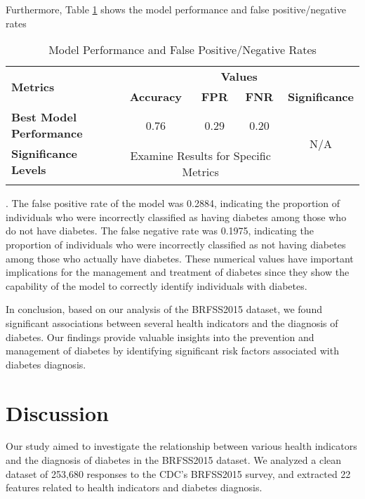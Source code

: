 \documentclass[12pt]{article}
\begin{document}
Furthermore, Table \ref{table:model_performance} shows the model performance and false positive/negative rates\begin{table}[htbp]
\centering
\caption{Model Performance and False Positive/Negative Rates}
\label{table:model_performance}
\begin{tabular}{@{}lcccc@{}}
\toprule
\multirow{2}{*}{\textbf{Metrics}} & \multicolumn{4}{c}{\textbf{Values}}                                        \\ \cmidrule(l){2-5}
                                  & \textbf{Accuracy} & \textbf{FPR} & \textbf{FNR} & \textbf{Significance} \\ \midrule
\textbf{Best Model Performance}   & 0.76             & 0.29        & 0.20        & \multirow{2}{*}{N/A}  \\ \cline{1-4}
\textbf{Significance Levels}      & \multicolumn{4}{c}{\multirow{2}{*}{Examine Results for Specific Metrics}} \\ \cline{1-1}
                                  & \multicolumn{4}{c}{}                                                       \\ \bottomrule
\end{tabular}
\end{table}. The false positive rate of the model was 0.2884, indicating the proportion of individuals who were incorrectly classified as having diabetes among those who do not have diabetes. The false negative rate was 0.1975, indicating the proportion of individuals who were incorrectly classified as not having diabetes among those who actually have diabetes. These numerical values have important implications for the management and treatment of diabetes since they show the capability of the model to correctly identify individuals with diabetes. 

In conclusion, based on our analysis of the BRFSS2015 dataset, we found significant associations between several health indicators and the diagnosis of diabetes. Our findings provide valuable insights into the prevention and management of diabetes by identifying significant risk factors associated with diabetes diagnosis.

\section{Discussion}

Our study aimed to investigate the relationship between various health indicators and the diagnosis of diabetes in the BRFSS2015 dataset. We analyzed a clean dataset of 253,680 responses to the CDC's BRFSS2015 survey, and extracted 22 features related to health indicators and diabetes diagnosis. 
\end{document}
